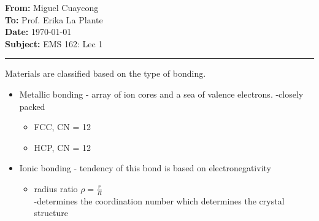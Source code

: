 \documentclass[11pt]{article}
\newcommand{\memoheader}[4]{
  \noindent
  \textbf{From:} #2\\ 
  \textbf{To:} #1\\
  \textbf{Date:} #3\\
  \textbf{Subject:} #4\\[1ex]\hrule\vspace{1.5ex}
}
\begin{document}
\memoheader{Prof. Erika La Plante}
            {Miguel Cuaycong}
            {\today}
            {EMS 162: Lec 1}
\noindent Materials are classified based on the type  of bonding.
\begin{itemize}
    \item Metallic bonding - array of ion cores and a sea of valence electrons.
    -closely packed
    \begin{itemize}
        \item FCC, CN = 12
        \item HCP, CN = 12
    \end{itemize}
    \item Ionic bonding - tendency of this bond is based on electronegativity
    \begin{itemize}
        \item radius ratio $\rho = \frac{r}{R}$
        \\
        -determines the coordination number which determines the crystal structure
    \end{itemize}
\end{itemize}
\end{document}
